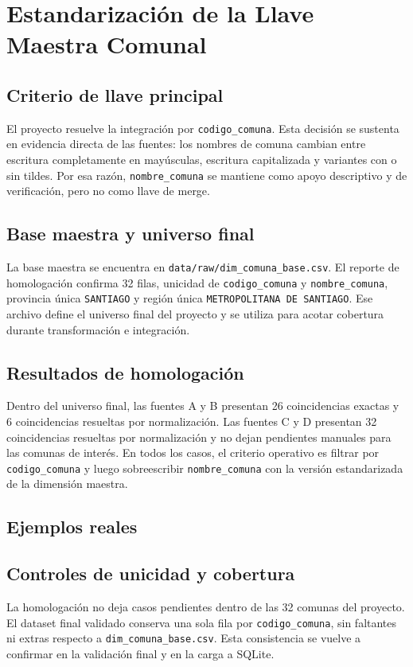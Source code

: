 \chapter{Estandarización de la Llave Maestra Comunal}

\section{Criterio de llave principal}

El proyecto resuelve la integración por \texttt{codigo\_comuna}. Esta decisión se sustenta en evidencia directa de las fuentes: los nombres de comuna cambian entre escritura completamente en mayúsculas, escritura capitalizada y variantes con o sin tildes. Por esa razón, \texttt{nombre\_comuna} se mantiene como apoyo descriptivo y de verificación, pero no como llave de merge.

\section{Base maestra y universo final}

La base maestra se encuentra en \texttt{data/raw/dim\_comuna\_base.csv}. El reporte de homologación confirma 32 filas, unicidad de \texttt{codigo\_comuna} y \texttt{nombre\_comuna}, provincia única \texttt{SANTIAGO} y región única \texttt{METROPOLITANA DE SANTIAGO}. Ese archivo define el universo final del proyecto y se utiliza para acotar cobertura durante transformación e integración.

\section{Resultados de homologación}

Dentro del universo final, las fuentes A y B presentan 26 coincidencias exactas y 6 coincidencias resueltas por normalización. Las fuentes C y D presentan 32 coincidencias resueltas por normalización y no dejan pendientes manuales para las comunas de interés. En todos los casos, el criterio operativo es filtrar por \texttt{codigo\_comuna} y luego sobreescribir \texttt{nombre\_comuna} con la versión estandarizada de la dimensión maestra.



\section{Ejemplos reales}



\section{Controles de unicidad y cobertura}

La homologación no deja casos pendientes dentro de las 32 comunas del proyecto. El dataset final validado conserva una sola fila por \texttt{codigo\_comuna}, sin faltantes ni extras respecto a \texttt{dim\_comuna\_base.csv}. Esta consistencia se vuelve a confirmar en la validación final y en la carga a SQLite.
